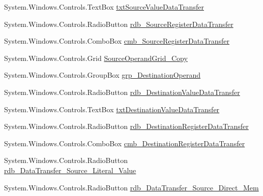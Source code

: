 \begin{DoxyCompactItemize}
\item 
System.\+Windows.\+Controls.\+Text\+Box \hyperlink{class_c_p_u___o_s___simulator_1_1_instructions_window_a44cd8a2732d939d1746051f8b2093500}{txt\+Source\+Value\+Data\+Transfer}
\item 
System.\+Windows.\+Controls.\+Radio\+Button \hyperlink{class_c_p_u___o_s___simulator_1_1_instructions_window_a0d449427537f2c5baea2e2b7e669a9d7}{rdb\+\_\+\+Source\+Register\+Data\+Transfer}
\item 
System.\+Windows.\+Controls.\+Combo\+Box \hyperlink{class_c_p_u___o_s___simulator_1_1_instructions_window_ae2136d0a711f92a681278571fbe2868b}{cmb\+\_\+\+Source\+Register\+Data\+Transfer}
\item 
System.\+Windows.\+Controls.\+Grid \hyperlink{class_c_p_u___o_s___simulator_1_1_instructions_window_a46fbe457dccbe131387644a73cc19b19}{Source\+Operand\+Grid\+\_\+\+Copy}
\item 
System.\+Windows.\+Controls.\+Group\+Box \hyperlink{class_c_p_u___o_s___simulator_1_1_instructions_window_a836175caed2a6d02d8635bb6cc3f6cae}{grp\+\_\+\+Destination\+Operand}
\item 
System.\+Windows.\+Controls.\+Radio\+Button \hyperlink{class_c_p_u___o_s___simulator_1_1_instructions_window_a03ff2485a6554464a5c6c2b012dafd1a}{rdb\+\_\+\+Destination\+Value\+Data\+Transfer}
\item 
System.\+Windows.\+Controls.\+Text\+Box \hyperlink{class_c_p_u___o_s___simulator_1_1_instructions_window_a84f7cc6d64bd8050be7c729f469cd29c}{txt\+Destination\+Value\+Data\+Transfer}
\item 
System.\+Windows.\+Controls.\+Radio\+Button \hyperlink{class_c_p_u___o_s___simulator_1_1_instructions_window_a00e9e3013355f592d97a38b29e94899c}{rdb\+\_\+\+Destination\+Register\+Data\+Transfer}
\item 
System.\+Windows.\+Controls.\+Combo\+Box \hyperlink{class_c_p_u___o_s___simulator_1_1_instructions_window_a2cf44cbfe54b2d8f024d5c06067320a1}{cmb\+\_\+\+Destination\+Register\+Data\+Transfer}
\item 
System.\+Windows.\+Controls.\+Radio\+Button \hyperlink{class_c_p_u___o_s___simulator_1_1_instructions_window_a9efc7a78510cfbc3998caf4f58b5df71}{rdb\+\_\+\+Data\+Transfer\+\_\+\+Source\+\_\+\+Literal\+\_\+\+Value}
\item 
System.\+Windows.\+Controls.\+Radio\+Button \hyperlink{class_c_p_u___o_s___simulator_1_1_instructions_window_a740dacbbcf90db5335b48cdf4ec91b59}{rdb\+\_\+\+Data\+Transfer\+\_\+\+Source\+\_\+\+Direct\+\_\+\+Mem}
\item 

\end{DoxyCompactItemize}
